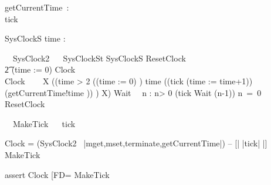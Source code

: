 
\begin{circus}
  \circchannel getCurrentTime~:~\nat\\
  \circchannel tick
\end{circus}

\begin{schema}{SysClockS}
 time : \nat
\end{schema}

\begin{circus}%
  \circprocess\ ~SysClock2 ~\circdef~\circbegin
  \circstate SysClockSt  SysClockS
  ResetClock ~\circdef~
  \\\t2  (time := 0) \circseq Clock\\
  Clock ~\circdef~ 
  \circmu~X \circspot 
    ((\circif time > 2 \circthen ((time := 0) \circseq \Skip) 
        \circelse time  \circthen ((tick \then (time := time+1)) \interleave (getCurrentTime!time \then \Skip))
        \circfi) \circseq X)
  Wait~\circdef~ \circvar n : \nat \circspot
   \circif n> 0 \circthen (tick \then Wait (n-1))
   \circelse n~=~0 \circthen \Skip
   \circfi\\
  \circspot ResetClock
  \circend
\end{circus}
\begin{circus}
\circprocess\ ~MakeTick ~\circdef~\circbegin
\circspot tick \then \Skip
\circend
\end{circus}

Clock = 
  (SysClock2 \ {|mget,mset,terminate,getCurrentTime|}) 
  -- [| {|tick|} |] MakeTick 

assert Clock [FD= MakeTick
